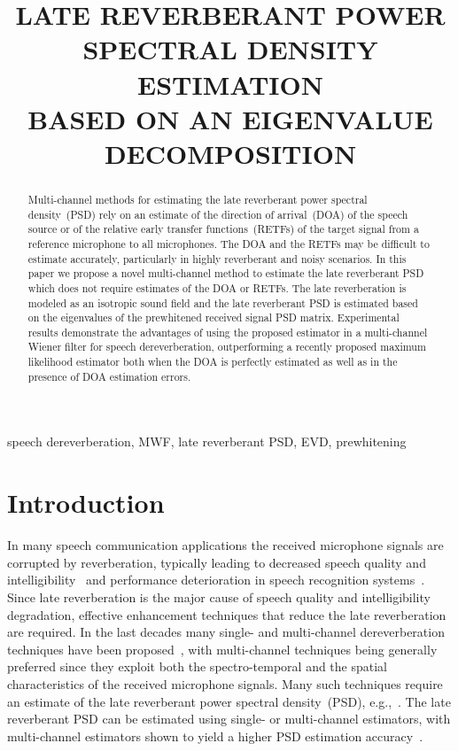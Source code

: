 \documentclass{article}
\title{LATE REVERBERANT POWER SPECTRAL DENSITY ESTIMATION \\ BASED ON AN EIGENVALUE DECOMPOSITION}
\begin{document}
\newlength\figureheight
\newlength\figurewidth
\setlength\figureheight{1.9cm}
\setlength{}
\ninept
%
\maketitle
%
\begin{abstract}
  Multi-channel methods for estimating the late reverberant power spectral density~(PSD) rely on an estimate of the direction of arrival~(DOA) of the speech source or of the relative early transfer functions~(RETFs) of the target signal from a reference microphone to all microphones.
  The DOA and the RETFs may be difficult to estimate accurately, particularly in highly reverberant and noisy scenarios.
  In this paper we propose a novel multi-channel method to estimate the late reverberant PSD which does not require estimates of the DOA or RETFs. 
The late reverberation is modeled as an isotropic sound field and the late reverberant PSD is estimated based on the eigenvalues of the prewhitened received signal PSD matrix.
Experimental results demonstrate the advantages of using the proposed estimator in a multi-channel Wiener filter for speech dereverberation, outperforming a recently proposed maximum likelihood estimator both when the DOA is perfectly estimated as well as in the presence of DOA estimation errors. 
\end{abstract}
%
\begin{keywords}
speech dereverberation, MWF, late reverberant PSD, EVD, prewhitening
\end{keywords}
%
\section{Introduction}
\label{sec:intro}

In many speech communication applications the received microphone signals are corrupted by reverberation, typically leading to decreased speech quality and intelligibility~\cite{Beutelmann_2006,Goetze_AES_2010,Warzybok_IWAENC_2014} and performance deterioration in speech recognition systems~\cite{Yoshioka_ISPM_2012,Xiong_EURASIP_2015}. 
Since late reverberation is the major cause of speech quality and intelligibility degradation, effective enhancement techniques that reduce the late reverberation are required.
In the last decades many single- and multi-channel dereverberation techniques have been proposed~\cite{Naylor_Derev_book}, with multi-channel techniques being generally preferred since they exploit both the spectro-temporal and the spatial characteristics of the received microphone signals.
Many such techniques require an estimate of the late reverberant power spectral density~(PSD), e.g.,~\cite{Braun_EUSIPCO_2013,Kuklasinski_EUSIPCO_2014g,OSchwartz_ITASLP_2015}.
The late reverberant PSD can be estimated using single- or multi-channel estimators, with multi-channel estimators shown to yield a higher PSD estimation accuracy~\cite{Jensen_ICASSP_2015}.
\end{document}
